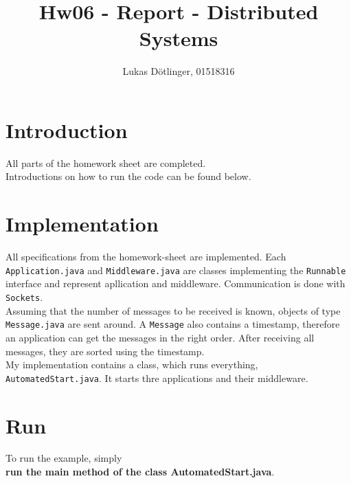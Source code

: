 \documentclass{article}
\begin{document}
  \title{Hw06 - Report - Distributed Systems}
  \date{}
  \author{Lukas Dötlinger, 01518316}
	
  \maketitle
  
  \section*{Introduction}
  
  	All parts of the homework sheet are completed.\\
  	Introductions on how to run the code can be found below.\\
  	
  \section*{Implementation}
  
    All specifications from the homework-sheet are implemented. Each \texttt{Application.java} and \texttt{Middleware.java} are classes implementing the \texttt{Runnable} interface and represent apllication and middleware. Communication is done with \texttt{Sockets}.\\
    Assuming that the number of messages to be received is known, objects of type \texttt{Message.java} are sent around. A \texttt{Message} also contains a timestamp, therefore an application can get the messages in the right order. After receiving all messages, they are sorted using the timestamp.\\
    My implementation contains a class, which runs everything, \texttt{AutomatedStart.java}. It starts thre applications and their middleware.\\
    
  \section*{Run}
  
    To run the example, simply\\ \textbf{run the main method of the class AutomatedStart.java}.\\
  
\end{document}
